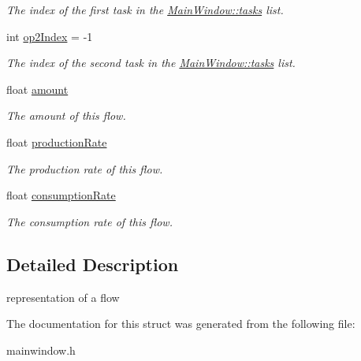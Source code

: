 \begin{DoxyCompactItemize}
\begin{DoxyCompactList}\small\item\em The index of the first task in the \hyperlink{class_main_window_ab302362b256360d527a628bdbfcde171}{Main\+Window\+::tasks} list. \end{DoxyCompactList}\item 
\hypertarget{struct_flow_a42b73eff59dc5fc3e344ac5822280c57}{}int \hyperlink{struct_flow_a42b73eff59dc5fc3e344ac5822280c57}{op2\+Index} = -\/1\label{struct_flow_a42b73eff59dc5fc3e344ac5822280c57}

\begin{DoxyCompactList}\small\item\em The index of the second task in the \hyperlink{class_main_window_ab302362b256360d527a628bdbfcde171}{Main\+Window\+::tasks} list. \end{DoxyCompactList}\item 
\hypertarget{struct_flow_a381b8842d6e76fef6d17e78429562272}{}float \hyperlink{struct_flow_a381b8842d6e76fef6d17e78429562272}{amount}\label{struct_flow_a381b8842d6e76fef6d17e78429562272}

\begin{DoxyCompactList}\small\item\em The amount of this flow. \end{DoxyCompactList}\item 
\hypertarget{struct_flow_ae2bf28c63b4fe1e8d5681be424b59bec}{}float \hyperlink{struct_flow_ae2bf28c63b4fe1e8d5681be424b59bec}{production\+Rate}\label{struct_flow_ae2bf28c63b4fe1e8d5681be424b59bec}

\begin{DoxyCompactList}\small\item\em The production rate of this flow. \end{DoxyCompactList}\item 
\hypertarget{struct_flow_a4173165c2c3055d690d5e6584c66e5e6}{}float \hyperlink{struct_flow_a4173165c2c3055d690d5e6584c66e5e6}{consumption\+Rate}\label{struct_flow_a4173165c2c3055d690d5e6584c66e5e6}

\begin{DoxyCompactList}\small\item\em The consumption rate of this flow. \end{DoxyCompactList}\end{DoxyCompactItemize}


\subsection{Detailed Description}
representation of a flow 

The documentation for this struct was generated from the following file\+:\begin{DoxyCompactItemize}
\item 
mainwindow.\+h\end{DoxyCompactItemize}
